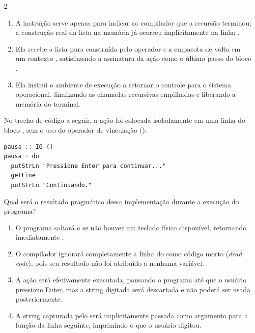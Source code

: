 \documentclass[a4paper,10pt,brazil]{article}
\begin{document}
\begin{multicols}{2}
\begin{enumerate}
  \item A instrução  serve apenas para indicar ao compilador que a recursão terminou; a construção real da lista na memória já ocorreu implicitamente na linha .

  \item Ela recebe a lista pura construída pelo operador \haskellinline{(:)} e a empacota de volta em um contexto , satisfazendo a assinatura da ação como o último passo do bloco .

  \item Ela instrui o ambiente de execução a retornar o controle para o sistema operacional, finalizando as chamadas recursivas empilhadas e liberando a memória do terminal.


\end{enumerate}

No trecho de código a seguir, a ação  foi colocada isoladamente em uma linha do bloco , sem o uso do operador de vinculação (\haskellinline{<-}):

\begin{verbatim}
pausa :: IO ()
pausa = do
  putStrLn "Pressione Enter para continuar..."
  getLine
  putStrLn "Continuando."
\end{verbatim}

Qual será o resultado pragmático dessa implementação durante a execução do programa?

\begin{enumerate}
  \item O programa saltará o  se não houver um teclado físico disponível, retornando imediatamente .

  \item O compilador ignorará completamente a linha do  como código morto (\emph{dead code}), pois seu resultado não foi atribuído a nenhuma variável.

  \item A ação  será efetivamente executada, pausando o programa até que o usuário pressione Enter, mas a string digitada será descartada e não poderá ser usada posteriormente.

  \item A string capturada pelo  será implicitamente passada como argumento para a função  da linha seguinte, imprimindo o que o usuário digitou.


\end{enumerate}
\end{multicols}
\end{document}
